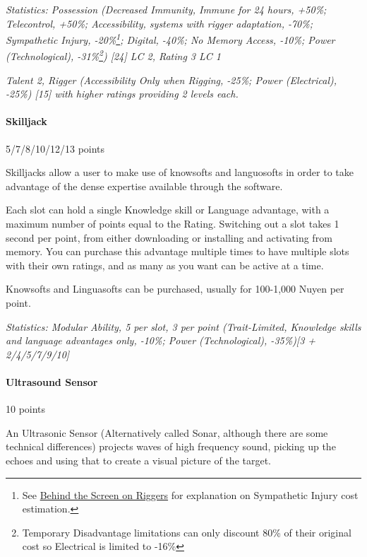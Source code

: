 \begin{multicols*}{3}
	\textit{\textcolor{OliveGreen}{Statistics: Possession (Decreased Immunity, Immune for 24 hours, +50\%; Telecontrol, +50\%; Accessibility, systems with rigger adaptation, -70\%; Sympathetic Injury, -20\%\footnote{See \hyperref[bts_riggers]{Behind the Screen on Riggers} for explanation on Sympathetic Injury cost estimation.}; Digital, -40\%; No Memory Access, -10\%; Power (Technological), -31\%\footnote{Temporary Disadvantage limitations can only discount 80\% of their original cost  so Electrical is limited to -16\%}) [24] LC 2, Rating 3 LC 1}}
	
	\textit{\textcolor{OliveGreen}{Talent 2, Rigger (Accessibility  Only when Rigging, -25\%; Power (Electrical), -25\%) [15] with higher ratings providing 2 levels each.}}
	
	\paragraph{Skilljack}
	\begin{flushright}
		5/7/8/10/12/13 points
	\end{flushright}
	
	Skilljacks allow a user to make use of knowsofts and languosofts in order to take advantage of the dense expertise available through the software. 
	
	Each slot can hold a single Knowledge skill or Language advantage, with a maximum number of points equal to the Rating. Switching out a slot takes 1 second per point, from either downloading or installing and activating from memory. You can purchase this advantage multiple times to have multiple slots with their own ratings, and as many as you want can be active at a time.
	
	Knowsofts and Linguasofts can be purchased, usually for 100-1,000 Nuyen per point.
	
	\textit{\textcolor{OliveGreen}{Statistics: Modular Ability, 5 per slot, 3 per point (Trait-Limited, Knowledge skills and language advantages only, -10\%; Power (Technological), -35\%)[3 + 2/4/5/7/9/10]}}
	
	\paragraph{Ultrasound Sensor}
	\begin{flushright}
		10 points
	\end{flushright}
	
	An Ultrasonic Sensor (Alternatively called Sonar, although there are some technical differences) projects waves of high frequency sound, picking up the echoes and using that to create a visual picture of the target.
	

\end{multicols*}

